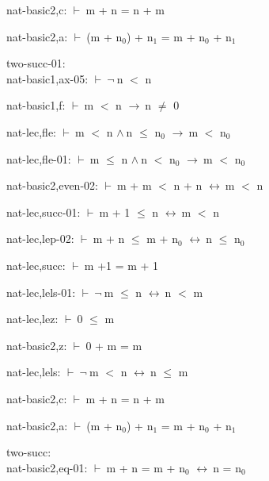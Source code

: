 \documentclass[a4paper]{article}
\newcommand{\Fol}{\mbox{$\vdash\ $}}
\newcommand{\Not}{\mbox{$\neg\ $}}
\newcommand{\And}{\mbox{$\wedge\ $}}
\newcommand{\Imp}{\mbox{$\rightarrow\ $}}
\newcommand{\Equiv}{\mbox{$\leftrightarrow\ $}}
\begin{document}
nat-basic2,c: 
 \Fol m + n = n + m



nat-basic2,a: 
 \Fol (m + $\mbox{n}_{0}$) + $\mbox{n}_{1}$ = m + $\mbox{n}_{0}$ + $\mbox{n}_{1}$



\bigskip

two-succ-01:\\ nat-basic1,ax-05: 
 \Fol \Not n $<$ n



nat-basic1,f: 
 \Fol m $<$ n \Imp n $\neq$ 0



nat-lec,fle: 
 \Fol m $<$ n \And n $\le$ $\mbox{n}_{0}$ \Imp m $<$ $\mbox{n}_{0}$



nat-lec,fle-01: 
 \Fol m $\le$ n \And n $<$ $\mbox{n}_{0}$ \Imp m $<$ $\mbox{n}_{0}$



nat-basic2,even-02: 
 \Fol m + m $<$ n + n \Equiv m $<$ n



nat-lec,succ-01: 
 \Fol m + 1 $\le$ n \Equiv m $<$ n



nat-lec,lep-02: 
 \Fol m + n $\le$ m + $\mbox{n}_{0}$ \Equiv n $\le$ $\mbox{n}_{0}$



nat-lec,succ: 
 \Fol m +1 = m + 1



nat-lec,lels-01: 
 \Fol \Not m $\le$ n \Equiv n $<$ m



nat-lec,lez: 
 \Fol 0 $\le$ m



nat-basic2,z: 
 \Fol 0 + m = m



nat-lec,lels: 
 \Fol \Not m $<$ n \Equiv n $\le$ m



nat-basic2,c: 
 \Fol m + n = n + m



nat-basic2,a: 
 \Fol (m + $\mbox{n}_{0}$) + $\mbox{n}_{1}$ = m + $\mbox{n}_{0}$ + $\mbox{n}_{1}$



\bigskip

two-succ:\\ nat-basic2,eq-01: 
 \Fol m + n = m + $\mbox{n}_{0}$ \Equiv n = $\mbox{n}_{0}$
\end{document}
